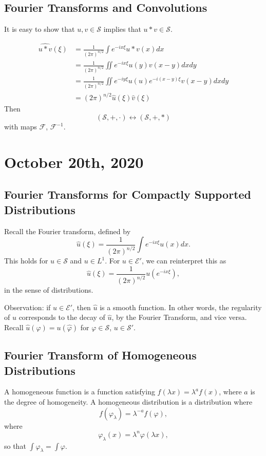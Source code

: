 \documentclass[11pt]{scrartcl}
\renewcommand{\hat}{\widehat}
\let \phi \varphi
\begin{document}
\subsection{Fourier Transforms and Convolutions}
It is easy to show that $u, v \in \mathcal S$ implies that $u * v \in \mathcal S$.

\begin{align*}
\hat{u*v}(\xi) &=\frac{1}{(2\pi)^{n/2}} \int e^{-ix\xi} u*v(x)dx \\
&= \frac{1}{(2\pi)^{n/2}}\iint e^{-ix\xi} u(y)v(x-y)dxdy \\
&= \frac{1}{(2\pi)^{n/2}} \iint e^{-iy\xi}u(u)e^{-i(x-y)\xi}v(x-y) dxdy \\
&= (2\pi)^{n/2}\hat{u}(\xi) \hat{v}(\xi)
\end{align*}
Then
$$(\mathcal S, +, \cdot) \leftrightarrow (\mathcal S, +, *)$$
with maps $\mathcal F$, $\mathcal F^{-1}$.

\pagebreak
\section{October 20th, 2020}
\subsection{Fourier Transforms for Compactly Supported Distributions}
Recall the Fourier transform, defined by 
$$\hat{u}(\xi) = \frac{1}{(2\pi)^{n/2}}\int e^{-ix\xi}u(x)dx.$$
This holds for $u \in \mathcal S$ and $u \in L^1$.  For $u \in \mathcal E'$, we can reinterpret this as 
$$\hat{u}(\xi) = \frac{1}{(2\pi)^{n/2}} u(e^{-ix\xi}),$$
in the sense of distributions.

Observation: if $u \in \mathcal E'$, then $\hat{u}$ is a smooth function.  In other words, the regularity of $u$ corresponds to the decay of $\hat{u}$, by the Fourier Transform, and vice versa.  Recall $\hat{u}(\phi) = u(\hat{\phi})$ for $\phi \in \mathcal S$, $u \in \mathcal S'$.

\subsection{Fourier Transform of Homogeneous Distributions}
A homogeneous function is a function satisfying $f(\lambda x) = \lambda^a f(x)$, where $a$ is the degree of homogeneity.  A homogeneous distribution is a distribution where
$$f(\phi_\lambda) = \lambda^{-a} f(\phi),$$
where $$\phi_\lambda(x) = \lambda^{n}\phi(\lambda x),$$
so that $\int \phi_\lambda = \int \phi$.
\end{document}
